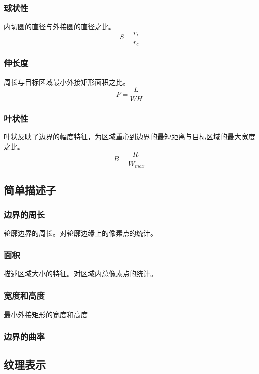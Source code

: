 \subsubsection{球状性}
内切圆的直径与外接圆的直径之比。
    \begin{displaymath}
    S=\frac{r_{i}}{r_{c}}
    \end{displaymath}
    
\subsubsection{伸长度}
周长与目标区域最小外接矩形面积之比。
    \begin{displaymath}
    P=\frac{L}{WH}
    \end{displaymath}

\subsubsection{叶状性}
叶状反映了边界的幅度特征，为区域重心到边界的最短距离与目标区域的最大宽度之比。
    \begin{displaymath}
    B=\frac{R_{1}}{W_{max}}
    \end{displaymath}

\subsection{简单描述子}

\subsubsection{边界的周长}
轮廓边界的周长。对轮廓边缘上的像素点的统计。

\subsubsection{面积}
描述区域大小的特征。对区域内总像素点的统计。

\subsubsection{宽度和高度}
最小外接矩形的宽度和高度

\subsubsection{边界的曲率}

\subsection{纹理表示}

